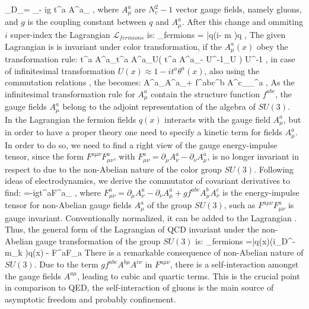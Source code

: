 	\beqa
		\partial_\mu \rightarrow D_\mu = \partial_\mu - ig t^a A^a_\mu \; ,
	\eeqa
	where $A^a_\mu$ are $N_c^2-1$ vector gauge fields, namely gluons, and $g$ is the coupling constant between $q$  and $A^a_\mu$. After this change and ommiting $i$ super-index the Lagrangian $\mathcal{L}_{fermions}$ is:
	\beqa
		\label{qcd_low:L_fermions}
		_{fermions} = \bar{q}(i\Dslash - m )q \;,
	\eeqa
	The given Lagrangian is is invariant under \Eq{\ref{qcd_low:color_transform_ferm}} color transformation, if the $A^a_\mu(x)$ obey the transformation rule:
	\beqa
		\label{qcd_low:color_transform_vector}
		t^a A^a_\mu \rightarrow t^a A^{\prime a}_\mu U\left( t^a A^a_\mu - U^{-1}\partial_\mu U \right) U^{-1} \;,
	\eeqa
	in case of infinitesimal transformation $U(x)\approx 1- it^a\theta^a(x)$, also using the commutation relations \Eq{\ref{qcd_low:commut_relation}}, the \Eq{\ref{qcd_low:color_transform_vector}} becomes:
	\beqa
	\delta A^{\prime a}_\mu \rightarrow A^a_\mu + f^{abc}\theta^b A^c_\mu {}\partial_\mu \theta^a \;,
	\eeqa
	As the infinitesimal transformation rule for $A^a_\mu$ contain the structure function $f^{abc}$, the gauge fields $A^a_\mu$ belong to the adjoint representation of the algebra of $SU(3)$. \\
	
	In the Lagrangian \Eq{\ref{qcd_low:L_fermions}} the fermion fields $q(x)$ interacts with the gauge field $A^a_\mu$, but in order to have a proper theory one need to specify a kinetic term for fields $A^a_\mu$. In order to do so, we need to find a right view of the gauge energy-impulse tensor, since the form $F^{a\mu\nu}F^a_{\mu\nu}$, with $F^a_{\mu\nu} = \partial_\mu A^a_\nu - \partial_\nu A^a_\mu$, is no longer invariant in respect to \Eq{\ref{qcd_low:color_transform_vector}} due to the non-Abelian nature of the color group $SU(3)$. Following ideas of electrodynamics, we derive the commutator of covariant derivatives to find:
	\beqa
		[D_\mu,D_\nu]=-igt^aF^a_{\mu\nu} \;,
	\eeqa	
	where $F^a_{\mu\nu} = \partial_\mu A^a_\nu - \partial_\nu A^a_\mu + gf^{abc}A^b_\mu A^c_\nu$ is the energy-impulse tensor for non-Abelian gauge fields $A^a_\mu$ of the group $SU(3)$, such as $F^{a\mu\nu}F^a_{\mu\nu}$ is gauge invariant. Conventionally normalized, it can be added to the Lagrangian \Eq{\ref{qcd_low:L_fermions}}. Thus, the general form of the Lagrangian of QCD invariant under the non-Abelian gauge transformation of the group $SU(3)$ is:
	\beqa
		\label{qcd_low:L_QCD}
		_{fermions} =\bar{q}(x)(i\gamma_\mu D^\mu - m_k )q(x) - F^{a\mu\nu}F_{a\mu\nu} \;
	\eeqa
	There is a remarkable consequence of non-Abelian nature of $SU(3)$. Due to the term $gf^{abc}A^{b\mu}A^{c\nu}$ in $F^{a\mu\nu}$, there is a self-interaction amongst the gauge fields $A^{a\mu}$, leading to cubic and quartic terms. This is the crucial point in comparison to QED, the self-interaction of gluons is the main source of asymptotic freedom \cite{Gross:1973ju} and probably confinement. 
	
